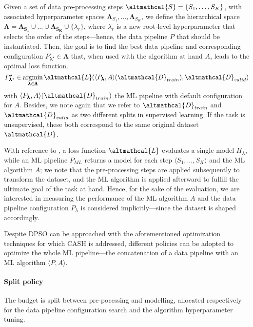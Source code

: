 \begin{definition}
    Given a set of data pre-processing steps $\altmathcal{S} = \{S_1, \dots, S_K\}$, with associated hyperparameter spaces  $\pmb{\Lambda}_{S_1}, \dots, \pmb{\Lambda}_{S_K}$, we define the hierarchical space $\pmb{\Lambda} = \pmb{\Lambda_{S_1}} \cup \dots \cup \pmb{\Lambda_{S_K}} \cup \{\lambda_r\}$, where $\lambda_r$ is a new root-level hyperparameter that selects the order of the steps---hence, the data pipeline $P$ that should be instantiated.
    Then, the goal is to find the best data pipeline and corresponding configuration $P^{\star}_{\pmb{\lambda}^{\star}} \in \pmb{\Lambda}$ that, when used with the algorithm at hand $A$, leads to the optimal loss function.
    \begin{equation*}
        P^{\star}_{\pmb{\lambda}^{\star}} \in \argmin_{\pmb{\lambda} \in \pmb{\Lambda}} \altmathcal{L}(\langle P_{\pmb{\lambda}}, A \rangle (\altmathcal{D}_{train}), \altmathcal{D}_{valid})
    \end{equation*}
    with $\langle P_{\pmb{\lambda}}, A \rangle (\altmathcal{D}_{train})$ the ML pipeline with default configuration for $A$.
    Besides, we note again that we refer to $\altmathcal{D}_{train}$ and $\altmathcal{D}_{valid}$ as two different splits in supervised learning. If the task is unsupervised, these both correspond to the same original dataset $\altmathcal{D}$.
\end{definition}

With reference to , a loss function $\altmathcal{L}$ evaluates a single model $H_{\lambda}$, while an ML pipeline $P_{ML}$ returns a model for each step $\langle S_1, \dots, S_K \rangle$ and the ML algorithm $A$; we note that the pre-processing steps are applied subsequently to transform the dataset, and the ML algorithm is applied afterward to fulfill the ultimate goal of the task at hand.
Hence, for the sake of the evaluation, we are interested in measuring the performance of the ML algorithm $A$ and the data pipeline configuration $P_{\lambda}$ is considered implicitly---since the dataset is shaped accordingly.

Despite DPSO can be approached with the aforementioned optimization techniques for which CASH is addressed, different policies can be adopted to optimize the whole ML pipeline---the concatenation of a data pipeline with an ML algorithm $\langle P, A \rangle$.

\paragraph{Split policy}
The budget is split between pre-pocessing and modelling, allocated respectively for the data pipeline configuration search and the algorithm hyperparameter tuning.

